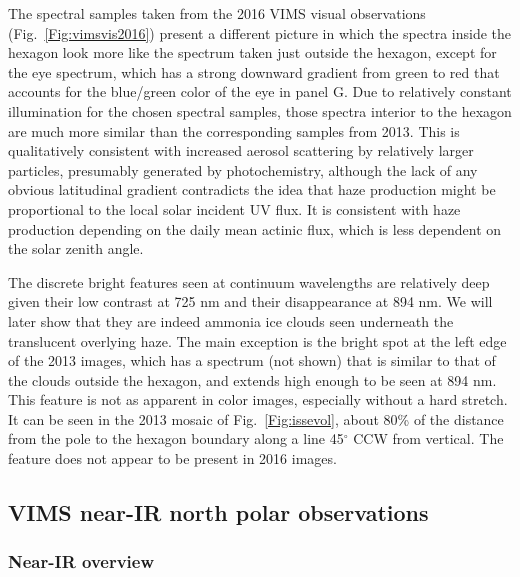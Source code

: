 \documentclass[article,11pt]{emulateapj}
\def\deg{$^\circ$ }
\begin{document}
The spectral samples taken from the 2016 VIMS visual observations
(Fig.\ \ref{Fig:vimsvis2016}) present a different picture in which the
spectra inside the hexagon look more like the spectrum taken just
outside the hexagon, except for the eye spectrum, which has a strong
downward gradient from green to red that accounts for the blue/green
color of the eye in panel G. Due to relatively constant illumination
for the chosen spectral samples, those spectra interior to the hexagon
are much more similar than the corresponding samples from 2013. This
is qualitatively consistent with increased aerosol scattering by
relatively larger particles, presumably generated by photochemistry,
although the lack of any obvious latitudinal gradient contradicts the
idea that haze production might be proportional to the local solar
incident UV flux. It is consistent with haze production depending on the daily
mean actinic flux, which is less dependent on the solar zenith angle.

The discrete bright features seen at continuum wavelengths are
relatively deep given their low contrast at 725 nm and their
disappearance at 894 nm. We will later show that they are indeed
ammonia ice clouds seen underneath the translucent overlying haze.
The main exception is the bright spot at the left edge of the 2013
images, which has a spectrum (not shown) that is similar to that of
the clouds outside the hexagon, and extends high enough to be seen at
894 nm.  This feature is not as apparent in color images, especially
without a hard stretch.  It can be seen in the 2013 mosaic of
Fig.\ \ref{Fig:issevol}, about 80\% of the distance from the pole to
the hexagon boundary along a line 45\deg CCW from vertical.  The
feature does not appear to be present in 2016 images.

\subsection{VIMS near-IR north polar observations}

\subsubsection{Near-IR overview}
\end{document}
